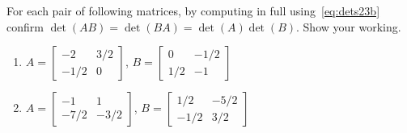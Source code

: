 \begin{exercise} 
For each pair of following matrices, by computing in full using~\eqref{eq:dets23b} confirm \(\det(AB)=\det(BA)=\det(A)\det(B)\). 
Show your working.
\begin{enumerate}
\item \(A=\begin{bmatrix} -2&3/2
\\-1/2&0 \end{bmatrix}\), 
\(B=\begin{bmatrix} 0&-1/2
\\1/2&-1 \end{bmatrix}\)

\item \(A=\begin{bmatrix} -1&1
\\-7/2&-3/2 \end{bmatrix}\), 
\(B=\begin{bmatrix} 1/2&-5/2
\\-1/2&3/2 \end{bmatrix}\)

\end{enumerate}
\end{exercise}
